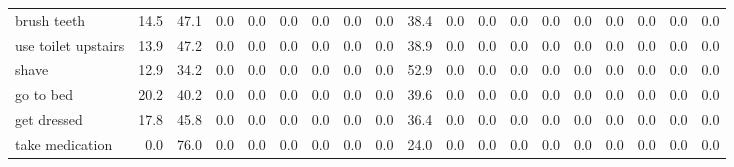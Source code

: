 \documentclass{article}
\begin{document}
\begin{sideways}
\begin{tabular}{lrrrrrrrrrrrrrrrrrr}
brush teeth                   &        14.5 &               47.1 &           0.0 &                          0.0 &                0.0 &                0.0 &                        0.0 &          0.0 &             38.4 &                0.0 &                    0.0 &                      0.0 &                  0.0 &                   0.0 &              0.0 &              0.0 &                                  0.0 &          0.0 \\
use toilet upstairs           &        13.9 &               47.2 &           0.0 &                          0.0 &                0.0 &                0.0 &                        0.0 &          0.0 &             38.9 &                0.0 &                    0.0 &                      0.0 &                  0.0 &                   0.0 &              0.0 &              0.0 &                                  0.0 &          0.0 \\
shave                         &        12.9 &               34.2 &           0.0 &                          0.0 &                0.0 &                0.0 &                        0.0 &          0.0 &             52.9 &                0.0 &                    0.0 &                      0.0 &                  0.0 &                   0.0 &              0.0 &              0.0 &                                  0.0 &          0.0 \\
go to bed                     &        20.2 &               40.2 &           0.0 &                          0.0 &                0.0 &                0.0 &                        0.0 &          0.0 &             39.6 &                0.0 &                    0.0 &                      0.0 &                  0.0 &                   0.0 &              0.0 &              0.0 &                                  0.0 &          0.0 \\
get dressed                   &        17.8 &               45.8 &           0.0 &                          0.0 &                0.0 &                0.0 &                        0.0 &          0.0 &             36.4 &                0.0 &                    0.0 &                      0.0 &                  0.0 &                   0.0 &              0.0 &              0.0 &                                  0.0 &          0.0 \\
take medication               &         0.0 &               76.0 &           0.0 &                          0.0 &                0.0 &                0.0 &                        0.0 &          0.0 &             24.0 &                0.0 &                    0.0 &                      0.0 &                  0.0 &                   0.0 &              0.0 &              0.0 &                                  0.0 &          0.0 \\

\end{tabular}
\end{sideways}
\end{document}
